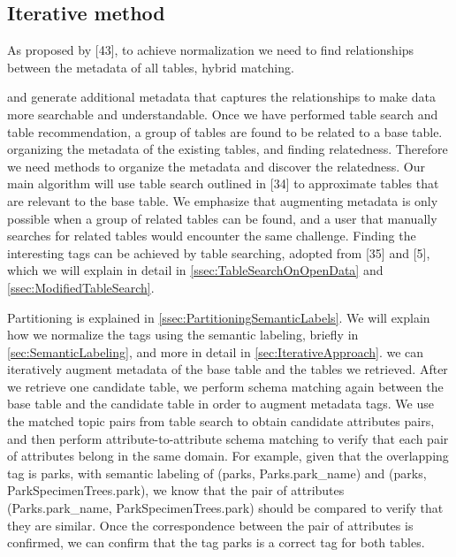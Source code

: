 \subsection{Iterative method}
\label{ssec:IterativeMethod}

As proposed by \cite{Smith2011Unity}[43], to achieve normalization we need to find relationships between the metadata of all tables, hybrid matching.

and generate additional metadata that captures the relationships to make data more searchable and understandable.
Once we have performed table search and table recommendation, a group of tables are found to be related to a base table.
organizing the metadata of the existing tables, and finding relatedness.
Therefore we need methods to organize the metadata and discover the relatedness.
Our main algorithm will use table search outlined in \cite{Mudgal2018Deep}[34] to approximate tables that are relevant to the base table.
We emphasize that augmenting metadata is only possible when a group of related tables can be found, and a user that manually searches for related tables would encounter the same challenge.
Finding the interesting tags can be achieved by table searching, adopted from \cite{Nargesian2018Table}[35] and \cite{conf/esws/EllefiBDT16}[5], which we will explain in detail in \autoref{ssec:TableSearchOnOpenData} and \autoref{ssec:ModifiedTableSearch}.

Partitioning is explained in \autoref{ssec:PartitioningSemanticLabels}.
We will explain how we normalize the tags using the semantic labeling, briefly in \autoref{sec:SemanticLabeling}, and more in detail in \autoref{sec:IterativeApproach}.
we can iteratively augment metadata of the base table and the tables we retrieved.
After we retrieve one candidate table, we perform schema matching again between the base table and the candidate table in order to augment metadata tags. We use the matched topic pairs from table search to obtain candidate attributes pairs, and then perform attribute-to-attribute schema matching to verify that each pair of attributes belong in the same domain. For example, given that the overlapping tag is parks, with semantic labeling of (parks, Parks.park\_name) and (parks, ParkSpecimenTrees.park), we know that the pair of attributes (Parks.park\_name, ParkSpecimenTrees.park) should be compared to verify that they are similar. Once the correspondence between the pair of attributes is confirmed, we can confirm that the tag parks is a correct tag for both tables.

